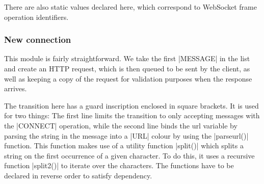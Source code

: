 	There are also static values declared here, which correspond to WebSocket
	frame operation identifiers.
	
	\subsubsection{New connection}
		
		
		This module is fairly straightforward. We take the first |MESSAGE|
		in the list and create an HTTP request, which is then queued to be sent by the
		client, as well as keeping a copy of the request for validation purposes when
		the response arrives.
		
		The transition here has a guard inscription enclosed in square brackets. It is
		used for two things:
		The first line limits the transition to only accepting messages with the
		|CONNECT|	operation, while the second line binds the url variable
		by parsing the string in the message into a |URL|
		colour by using the |parseurl()| function. This function makes use of
		a utility function |split()|  which splits a string on the first
		occurrence of a given character. To do this, it uses a recursive function
		|split2()| to iterate over the characters. The functions have to be
		declared in reverse order to satisfy dependency.
		
		
		
